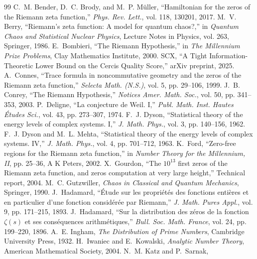 \documentclass[12pt,a4paper]{article}
\theoremstyle{remark}
\begin{document}
\begin{thebibliography}{99}
C.~M. Bender, D.~C. Brody, and M.~P. M\"uller,
``Hamiltonian for the zeros of the Riemann zeta function,''
\emph{Phys. Rev. Lett.}, vol. 118, 130201, 2017.
M.~V. Berry,
``Riemann's zeta function: A model for quantum chaos?,''
in \emph{Quantum Chaos and Statistical Nuclear Physics},
Lecture Notes in Physics, vol. 263, Springer, 1986.
E.~Bombieri,
``The Riemann Hypothesis,''
in \emph{The Millennium Prize Problems},
Clay Mathematics Institute, 2000.
SCX,
``A Tight Information-Theoretic Lower Bound on the Cercis Quality Score,''
arXiv preprint, 2025.
A.~Connes,
``Trace formula in noncommutative geometry and the zeros of the Riemann
zeta function,''
\emph{Selecta Math. (N.S.)}, vol. 5, pp. 29--106, 1999.
J.~B. Conrey,
``The Riemann Hypothesis,''
\emph{Notices Amer. Math. Soc.}, vol. 50, pp. 341--353, 2003.
P.~Deligne,
``La conjecture de Weil. I,''
\emph{Publ. Math. Inst. Hautes \'Etudes Sci.}, vol. 43, pp. 273--307, 1974.
F.~J. Dyson,
``Statistical theory of the energy levels of complex systems. I,''
\emph{J. Math. Phys.}, vol. 3, pp. 140--156, 1962.
F.~J. Dyson and M.~L. Mehta,
``Statistical theory of the energy levels of complex systems. IV,''
\emph{J. Math. Phys.}, vol. 4, pp. 701--712, 1963.
K.~Ford,
``Zero-free regions for the Riemann zeta function,''
in \emph{Number Theory for the Millennium, II},
pp. 25--36, A K Peters, 2002.
X.~Gourdon,
``The $10^{13}$ first zeros of the Riemann zeta function, and zeros
computation at very large height,''
Technical report, 2004.
M.~C. Gutzwiller,
\emph{Chaos in Classical and Quantum Mechanics},
Springer, 1990.
J.~Hadamard,
``\'Etude sur les propri\'et\'es des fonctions enti\`eres et en particulier
d'une fonction consid\'er\'ee par Riemann,''
\emph{J. Math. Pures Appl.}, vol. 9, pp. 171--215, 1893.
J.~Hadamard,
``Sur la distribution des z\'eros de la fonction $\zeta(s)$ et ses
cons\'equences arithm\'etiques,''
\emph{Bull. Soc. Math. France}, vol. 24, pp. 199--220, 1896.
A.~E. Ingham,
\emph{The Distribution of Prime Numbers},
Cambridge University Press, 1932.
H.~Iwaniec and E.~Kowalski,
\emph{Analytic Number Theory},
American Mathematical Society, 2004.
N.~M. Katz and P.~Sarnak,

\end{thebibliography}
\end{document}
